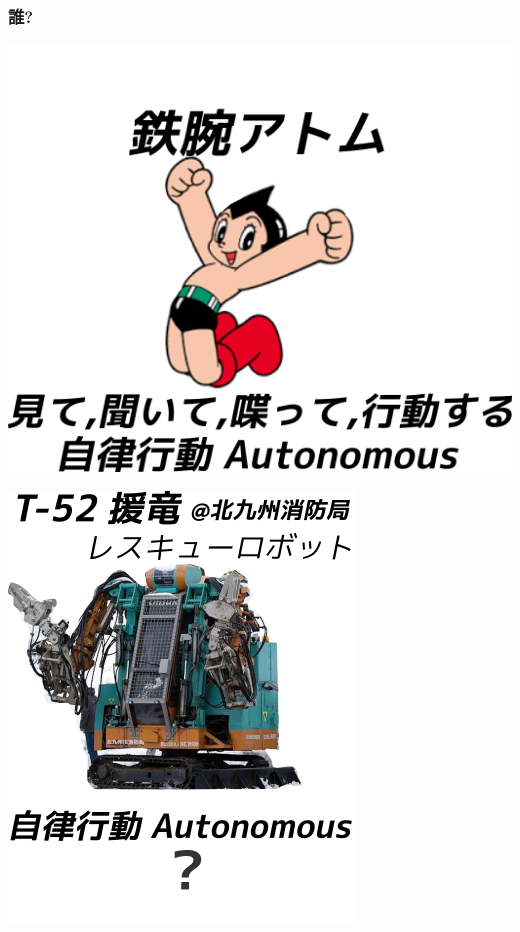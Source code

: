 \subsubsection{誰?}
\label{sec:orgheadline4}

\begin{container-fluid}
\begin{row-fluid}
\begin{span6}
\includegraphics{img/astro/final.png}
\end{span6}
\begin{span6}
\includegraphics{img/rescue/3.png}
\end{span6}
\end{row-fluid}
\begin{row-fluid}
\begin{span12}
\begin{xlarge}
　
\end{xlarge}
\end{span12}
\end{row-fluid}
\end{container-fluid}

